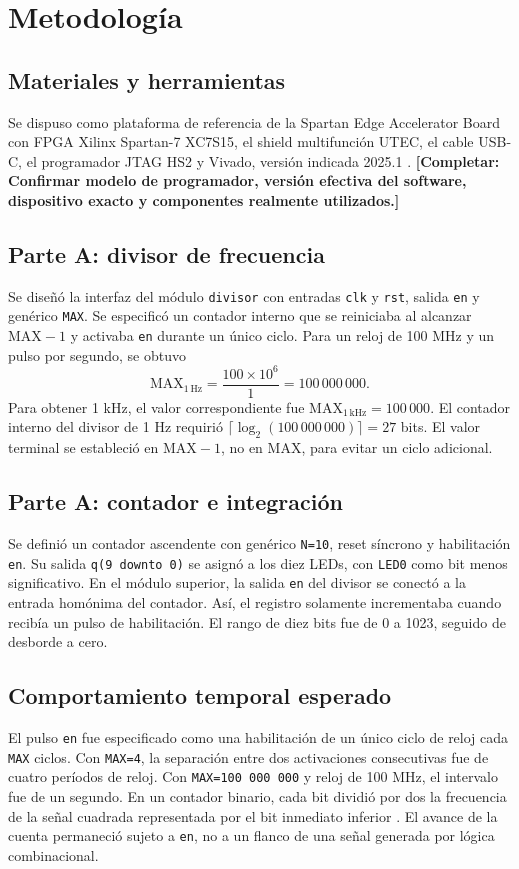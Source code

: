 \documentclass[conference]{IEEEtran}
\newcommand{\completar}[1]{\textcolor{pendiente}{\textbf{[Completar: #1]}}}
\begin{document}
\section{Metodología}
\subsection{Materiales y herramientas}
Se dispuso como plataforma de referencia de la Spartan Edge Accelerator Board con FPGA Xilinx Spartan-7 XC7S15, el shield multifunción UTEC, el cable USB-C, el programador JTAG HS2 y Vivado, versión indicada 2025.1 \cite{consigna}. \completar{Confirmar modelo de programador, versión efectiva del software, dispositivo exacto y componentes realmente utilizados.}

\subsection{Parte A: divisor de frecuencia}
Se diseñó la interfaz del módulo \texttt{divisor} con entradas \texttt{clk} y \texttt{rst}, salida \texttt{en} y genérico \texttt{MAX}. Se especificó un contador interno que se reiniciaba al alcanzar \(\mathrm{MAX}-1\) y activaba \texttt{en} durante un único ciclo. Para un reloj de 100 MHz y un pulso por segundo, se obtuvo
\begin{equation}
\mathrm{MAX}_{1\,\mathrm{Hz}}=\frac{100\times10^6}{1}=100\,000\,000.
\end{equation}
Para obtener 1 kHz, el valor correspondiente fue \(\mathrm{MAX}_{1\,\mathrm{kHz}}=100\,000\). El contador interno del divisor de 1 Hz requirió \(\lceil\log_2(100\,000\,000)\rceil=27\) bits. El valor terminal se estableció en \(\mathrm{MAX}-1\), no en \(\mathrm{MAX}\), para evitar un ciclo adicional.

\subsection{Parte A: contador e integración}
Se definió un contador ascendente con genérico \texttt{N=10}, reset síncrono y habilitación \texttt{en}. Su salida \texttt{q(9 downto 0)} se asignó a los diez LEDs, con \texttt{LED0} como bit menos significativo. En el módulo superior, la salida \texttt{en} del divisor se conectó a la entrada homónima del contador. Así, el registro solamente incrementaba cuando recibía un pulso de habilitación. El rango de diez bits fue de 0 a 1023, seguido de desborde a cero.

\subsection{Comportamiento temporal esperado}
El pulso \texttt{en} fue especificado como una habilitación de un único ciclo de reloj cada \texttt{MAX} ciclos. Con \texttt{MAX=4}, la separación entre dos activaciones consecutivas fue de cuatro períodos de reloj. Con \texttt{MAX=100\,000\,000} y reloj de 100 MHz, el intervalo fue de un segundo. En un contador binario, cada bit dividió por dos la frecuencia de la señal cuadrada representada por el bit inmediato inferior \cite{cursodiv}. El avance de la cuenta permaneció sujeto a \texttt{en}, no a un flanco de una señal generada por lógica combinacional.
\end{document}

